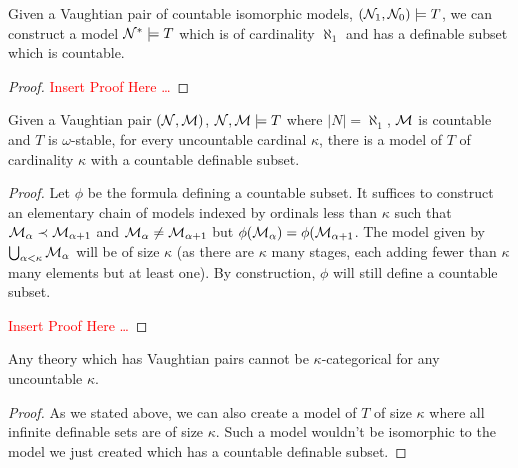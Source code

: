 \begin{theorem}\label{theorem_aleph_one_vaightian_pairs}
Given a Vaughtian pair of countable isomorphic models, \((\mathcal{N}_1, \mathcal{N}_0) \models T\), we can construct a model \(\mathcal{N}^*\models T\) which is of cardinality \(\aleph_1\) and has a definable subset which is countable.  
\end{theorem}

\begin{proof}
\textcolor{red}{Insert Proof Here \ldots}
\end{proof}

\begin{theorem}\label{theorem_uncountable_vaightian_pairs}
Given a Vaughtian pair \((\mathcal{N}, \mathcal{M})\), \(\mathcal{N}, \mathcal{M} \models T\) where \(|N| = \aleph_1\), \(\mathcal{M}\) is countable and \(T\) is \(\omega\)-stable, for every uncountable cardinal \(\kappa\), there is a model of \(T\) of cardinality \(\kappa\) with a countable definable subset.  
\end{theorem}

\begin{proof}
Let \(\phi\) be the formula defining a countable subset. 
It suffices to construct an elementary chain of models indexed by ordinals less than \(\kappa\) such that \(\mathcal{M}_\alpha \prec \mathcal{M}_{\alpha+1}\) and \(\mathcal{M}_\alpha \neq \mathcal{M}_{\alpha+1}\) but \(\phi(\mathcal{M}_\alpha) = \phi(\mathcal{M}_{\alpha+1}\). 
The model given by \(\bigcup_{\alpha<\kappa} \mathcal{M}_\alpha\) will be of size \(\kappa\) (as there are \(\kappa\) many stages, each adding fewer than \(\kappa\) many elements but at least one).
By construction, \(\phi\) will still define a countable subset. 

\textcolor{red}{Insert Proof Here \ldots} 
\end{proof}

\begin{theorem}\label{theorem_vaughtian_pairs_categoricity}
Any theory which has Vaughtian pairs cannot be \(\kappa\)-categorical for any uncountable \(\kappa\).
\end{theorem}

\begin{proof}
As we stated above, we can also create a model of \(T\) of size \(\kappa\) where all infinite definable sets are of size \(\kappa\). 
Such a model wouldn't be isomorphic to the model we just created which has a countable definable subset. 
\end{proof}
